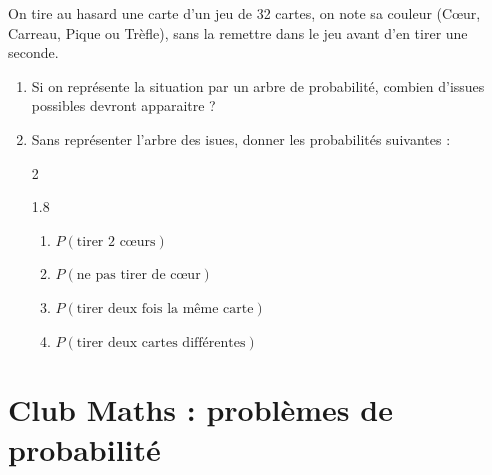 \documentclass[main.tex]{subfiles}
\begin{document}
\begin{exercise} 
	On tire au hasard une carte d'un jeu de 32 cartes, on note sa couleur (Cœur, Carreau, Pique ou Trèfle), sans la remettre dans le jeu avant d'en tirer une seconde.
	\begin{enumerate}[label={\arabic*)},leftmargin=*]
		\item Si on représente la situation par un arbre de probabilité, combien d'issues possibles devront apparaitre ?
		\item Sans représenter l'arbre des isues, donner  les probabilités suivantes :
\vspace{-0.5em} 
\begin{multicols}{2}
	\begin{spacing}{1.8}
		\begin{enumerate}[ label={},leftmargin=*] 
			\item $P(\text{tirer 2 cœurs})$
			\item $P(\text{ne pas tirer de cœur})$
			\item $P(\text{tirer deux fois la même carte})$
			\item $P(\text{tirer deux cartes différentes})$ 
		\end{enumerate}
	\end{spacing} 
\end{multicols}
\vspace{-1em}  
	\end{enumerate}
\end{exercise}
%	 
\newpage 

  
 
 
 
 
\newpage 
\section{Club Maths : problèmes de probabilité}
\end{document}
